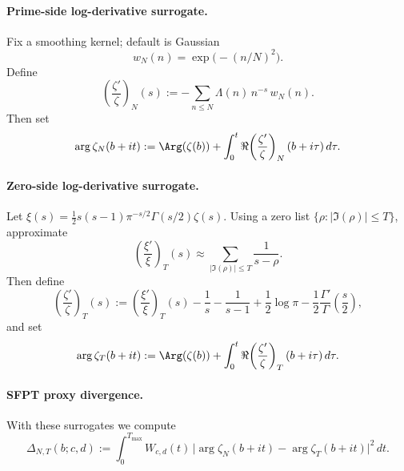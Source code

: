 \documentclass[11pt]{article}
\theoremstyle{definition}
\begin{document}
\paragraph{Prime-side log-derivative surrogate.}
Fix a smoothing kernel; default is Gaussian
\[
w_N(n)=\exp\!\bigl(-(n/N)^2\bigr).
\]
Define
\begin{equation}\label{eq:logderiv_prime}
\left(\frac{\zeta'}{\zeta}\right)_N(s):=-\sum_{n\le N}\Lambda(n)\,n^{-s}\,w_N(n).
\end{equation}
Then set
\begin{equation}\label{eq:arg_prime}
\arg\zeta_N(b+it)
:=
\Arg(\zeta(b))
+
\int_0^t \Re\!\left(\frac{\zeta'}{\zeta}\right)_N(b+i\tau)\,d\tau.
\end{equation}

\paragraph{Zero-side log-derivative surrogate.}
Let \(\xi(s)=\tfrac12 s(s-1)\pi^{-s/2}\Gamma(s/2)\zeta(s)\).
Using a zero list \(\{\rho:|\Im(\rho)|\le T\}\), approximate
\begin{equation}\label{eq:logderiv_xi_trunc}
\left(\frac{\xi'}{\xi}\right)_T(s)\approx \sum_{|\Im(\rho)|\le T}\frac{1}{s-\rho}.
\end{equation}
Then define
\begin{equation}\label{eq:logderiv_zero}
\left(\frac{\zeta'}{\zeta}\right)_T(s)
:=
\left(\frac{\xi'}{\xi}\right)_T(s)
-\frac{1}{s}-\frac{1}{s-1}+\frac12\log\pi-\frac12\frac{\Gamma'}{\Gamma}\!\left(\frac{s}{2}\right),
\end{equation}
and set
\begin{equation}\label{eq:arg_zero}
\arg\zeta_T(b+it)
:=
\Arg(\zeta(b))
+
\int_0^t \Re\!\left(\frac{\zeta'}{\zeta}\right)_T(b+i\tau)\,d\tau.
\end{equation}

\paragraph{SFPT proxy divergence.}
With these surrogates we compute
\begin{equation}\label{eq:DeltaNT}
\Delta_{N,T}(b;c,d)
:=
\int_0^{T_{\max}} W_{c,d}(t)\,
\bigl|\arg\zeta_N(b+it)-\arg\zeta_T(b+it)\bigr|^2\,dt.
\end{equation}
\end{document}
